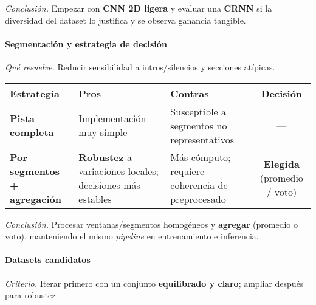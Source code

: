 \documentclass[12pt,twoside]{article}
\begin{document}
\textit{Conclusión.} Empezar con \textbf{CNN 2D ligera} y evaluar una \textbf{CRNN} si la diversidad del dataset lo justifica y se observa ganancia tangible.

\paragraph*{Segmentación y estrategia de decisión}

\textit{Qué resuelve.} Reducir sensibilidad a intros/silencios y secciones atípicas.

\begin{table}[h!]
  \centering
  \setlength{\tabcolsep}{4pt}
  \renewcommand{\arraystretch}{1.2}
  \footnotesize
  \begin{tabularx}{\textwidth}{l Y Y C}
    \toprule
    \textbf{Estrategia} & \textbf{Pros} & \textbf{Contras} & \textbf{Decisión} \\
    \midrule
    \textbf{Pista completa} & Implementación muy simple & Susceptible a segmentos no representativos & --- \\
    \textbf{Por segmentos + agregación} & \textbf{Robustez} a variaciones locales; decisiones más estables & Más cómputo; requiere coherencia de preprocesado & \textbf{Elegida} (promedio / voto) \\
    \bottomrule
  \end{tabularx}
\end{table}

\textit{Conclusión.} Procesar ventanas/segmentos homogéneos y \textbf{agregar} (promedio o voto), manteniendo el mismo \textit{pipeline} en entrenamiento e inferencia.

\paragraph*{Datasets candidatos}

\textit{Criterio.} Iterar primero con un conjunto \textbf{equilibrado y claro}; ampliar después para robustez.
\end{document}
